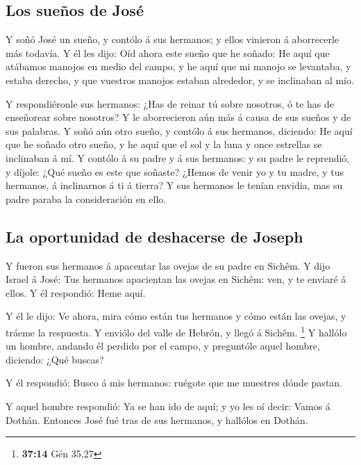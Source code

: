 \hypertarget{los-sueuxf1os-de-josuxe9}{%
\subsection{Los sueños de José}\label{los-sueuxf1os-de-josuxe9}}

 Y soñó José un sueño, y contólo á sus hermanos; y ellos
vinieron á aborrecerle más todavía.  Y él les dijo: Oíd
ahora este sueño que he soñado:  He aquí que atábamos
manojos en medio del campo, y he aquí que mi manojo se levantaba, y
estaba derecho, y que vuestros manojos estaban alrededor, y se
inclinaban al mío.

 Y respondiéronle sus hermanos: ¿Has de reinar tú sobre
nosotros, ó te has de enseñorear sobre nosotros? Y le aborrecieron aún
más á causa de sus sueños y de sus palabras.  Y soñó aún
otro sueño, y contólo á sus hermanos, diciendo: He aquí que he soñado
otro sueño, y he aquí que el sol y la luna y once estrellas se
inclinaban á mí.  Y contólo á su padre y á sus hermanos:
y su padre le reprendió, y díjole: ¿Qué sueño es este que soñaste?
¿Hemos de venir yo y tu madre, y tus hermanos, á inclinarnos á ti á
tierra?  Y sus hermanos le tenían envidia, mas su padre
paraba la consideración en ello.

\hypertarget{la-oportunidad-de-deshacerse-de-joseph}{%
\subsection{La oportunidad de deshacerse de
Joseph}\label{la-oportunidad-de-deshacerse-de-joseph}}

 Y fueron sus hermanos á apacentar las ovejas de su padre
en Sichêm.  Y dijo Israel á José: Tus hermanos apacientan
las ovejas en Sichêm: ven, y te enviaré á ellos. Y él respondió: Heme
aquí.

 Y él le dijo: Ve ahora, mira cómo están tus hermanos y
cómo están las ovejas, y tráeme la respuesta. Y enviólo del valle de
Hebrón, y llegó á Sichêm. \footnote{\textbf{37:14} Gén 35,27}
 Y hallólo un hombre, andando él perdido por el campo, y
preguntóle aquel hombre, diciendo: ¿Qué buscas?

 Y él respondió: Busco á mis hermanos: ruégote que me
muestres dónde pastan.

 Y aquel hombre respondió: Ya se han ido de aquí; y yo
les oí decir: Vamos á Dothán. Entonces José fué tras de sus hermanos, y
hallólos en Dothán.

